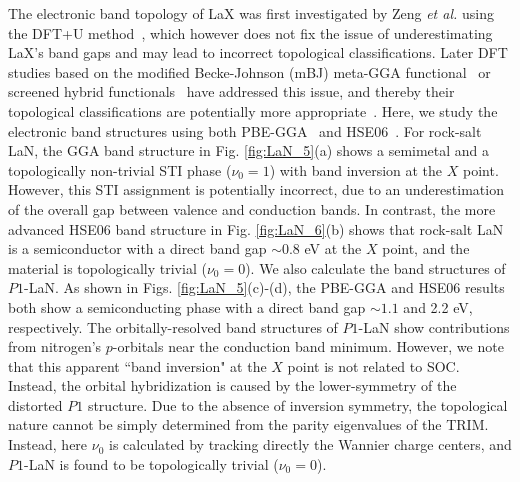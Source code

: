 	The electronic band topology of LaX was first investigated by Zeng \textit{et al.} using the DFT+U method~\cite{LaX_TI_Lin}, which however does not fix the issue of underestimating LaX's band gaps and may lead to incorrect topological classifications. Later DFT studies based on the modified Becke-Johnson (mBJ) meta-GGA functional~\cite{mBJ_1, mBJ_2} or screened hybrid functionals~\cite{HSE06} have addressed this issue, and thereby their topological classifications are potentially more appropriate~\cite{LaBi_LaSb_mBJ_guo2016,LaAs_mBJ_XMR_yang2017, LaBi_LaSb_topo_dey2018}. Here, we study the electronic band structures using both PBE-GGA~\cite{PBE} and HSE06~\cite{HSE06}. For rock-salt LaN, the GGA band structure in Fig. \ref{fig:LaN_5}(a) shows a semimetal and a topologically non-trivial STI phase ($\nu_0 = 1$) with band inversion at the $X$ point. However, this STI assignment is potentially incorrect, due to an underestimation of the overall gap between valence and conduction bands. In contrast, the more advanced HSE06 band structure in Fig. \ref{fig:LaN_6}(b) shows that rock-salt LaN is a semiconductor with a direct band gap $\sim 0.8$ eV at the $X$ point, and the material is topologically trivial ($\nu_0 = 0$). We also calculate the band structures of $P1$-LaN. As shown in Figs. \ref{fig:LaN_5}(c)-(d), the PBE-GGA and HSE06 results both show a semiconducting phase with a direct band gap $\sim 1.1$ and 2.2 eV, respectively. The orbitally-resolved band structures of $P1$-LaN show contributions from nitrogen's $p$-orbitals near the conduction band minimum. However, we note that this apparent ``band inversion" at the $X$ point is not related to SOC. Instead, the orbital hybridization is caused by the lower-symmetry of the distorted $P1$ structure. Due to the absence of inversion symmetry, the topological nature cannot be simply determined from the parity eigenvalues of the TRIM. Instead, here $\nu_0$ is calculated by tracking directly the Wannier charge centers, and $P1$-LaN is found to be topologically trivial ($\nu_0 = 0$).

